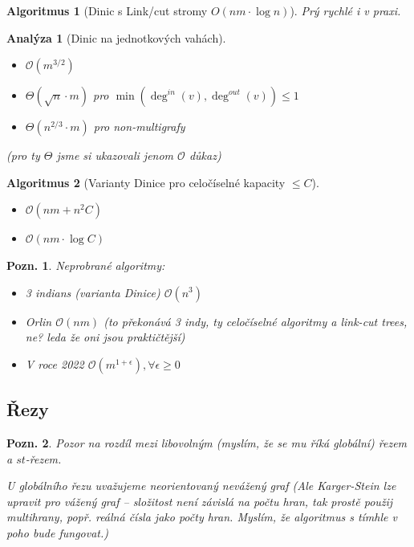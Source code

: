 \documentclass{article}
\theoremstyle{noparens}
\newtheorem*{alg}{Algoritmus}
\newtheorem*{anal}{Analýza}
\theoremstyle{noparens-mys}
\theoremstyle{noparens-note}
\newtheorem*{note}{Pozn.}
\newcommand{\OO}{\mathcal{O}}
\begin{document}
\begin{alg}[Dinic s Link/cut stromy $O(nm \cdot \log n)$]
    Prý rychlé i v praxi.
\end{alg}

\begin{anal}[Dinic na jednotkových vahách]
    ~

    \begin{itemize}
        \item $\OO(m^{3 / 2})$
        \item $\Theta(\sqrt{n} \cdot m)$ pro $\min(\deg^{in}(v), \deg^{out}(v)) \le 1$
        \item $\Theta(n^{2/3} \cdot m)$ pro non-multigrafy
    \end{itemize}

    (pro ty $\Theta$ jsme si ukazovali jenom $\OO$ důkaz)
\end{anal}

\begin{alg}[Varianty Dinice pro celočíselné kapacity $\le C$]
    ~

    \begin{itemize}
        \item $\OO(nm + n^2C)$
        \item $\OO(nm \cdot \log C)$
    \end{itemize}
\end{alg}

\begin{note}
    Neprobrané algoritmy:
    \begin{itemize}
        \item 3 indians (varianta Dinice) $\OO(n^3)$
        \item Orlin $\OO(nm)$ (to překonává 3 indy, ty celočíselné algoritmy a
            link-cut trees, ne? leda že oni jsou praktičtější)
        \item V roce 2022 $\OO(m^{1 + \epsilon}), \forall \epsilon \ge 0$
    \end{itemize}
\end{note}


\subsection{Řezy}

\begin{note}
    Pozor na rozdíl mezi libovolným (myslím, že se mu říká \emph{globální})
    řezem a $st$-řezem.

    U globálního řezu uvažujeme neorientovaný
    nevážený graf (Ale Karger-Stein lze upravit pro vážený graf -- složitost
    není závislá na počtu hran, tak prostě použij multihrany, popř. reálná
    čísla jako počty hran. Myslím, že algoritmus s tímhle v poho bude
    fungovat.)
\end{note}
\end{document}
